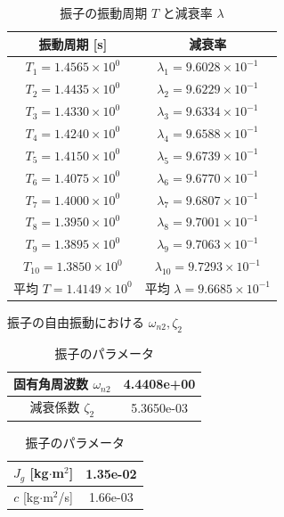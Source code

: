 \begin{table}[h]
  \centering
  \caption{振子の振動周期 \( T \) と減衰率 \( \lambda \)}
  \label{tab:振子の振動周期と減衰率}
  \begin{tabular}{|c|c|}
    \hline
    振動周期 [s]                        & 減衰率                                     \\
    \hline
    \( T_1 = 1.4565 \times 10^{0} \)    & \( \lambda_1 = 9.6028 \times 10^{-1} \)    \\
    \( T_2 = 1.4435 \times 10^{0} \)    & \( \lambda_2 = 9.6229 \times 10^{-1} \)    \\
    \( T_3 = 1.4330 \times 10^{0} \)    & \( \lambda_3 = 9.6334 \times 10^{-1} \)    \\
    \( T_4 = 1.4240 \times 10^{0} \)    & \( \lambda_4 = 9.6588 \times 10^{-1} \)    \\
    \( T_5 = 1.4150 \times 10^{0} \)    & \( \lambda_5 = 9.6739 \times 10^{-1} \)    \\
    \( T_6 = 1.4075 \times 10^{0} \)    & \( \lambda_6 = 9.6770 \times 10^{-1} \)    \\
    \( T_7 = 1.4000 \times 10^{0} \)    & \( \lambda_7 = 9.6807 \times 10^{-1} \)    \\
    \( T_8 = 1.3950 \times 10^{0} \)    & \( \lambda_8 = 9.7001 \times 10^{-1} \)    \\
    \( T_9 = 1.3895 \times 10^{0} \)    & \( \lambda_9 = 9.7063 \times 10^{-1} \)    \\
    \( T_{10} = 1.3850 \times 10^{0} \) & \( \lambda_{10} = 9.7293 \times 10^{-1} \) \\
    \hline
    平均 \( T = 1.4149 \times 10^{0} \) & 平均 \( \lambda = 9.6685 \times 10^{-1} \) \\
    \hline
  \end{tabular}
\end{table}

\begin{table}[h]
  \centering
  \begin{minipage}{0.45\linewidth}
    \centering
    \caption{振子の自由振動における $\omega_{n2}, \zeta_2$}
    \begin{tabular}{|c|c|}
      \hline
      固有角周波数 $\omega_{n2}$ & 4.4408e+00 \\
      \hline
      減衰係数 $\zeta_2$         & 5.3650e-03 \\
      \hline
    \end{tabular}
  \end{minipage}
  \hfill
  \begin{minipage}{0.45\linewidth}
    \centering
    \caption{振子のパラメータ}
    \begin{tabular}{|c|c|}
      \hline
      $J_g$ [kg$\cdot$m$^2$] & 1.35e-02 \\
      \hline
      $c$ [kg$\cdot$m$^2$/s] & 1.66e-03 \\
      \hline
    \end{tabular}
  \end{minipage}
\end{table}


